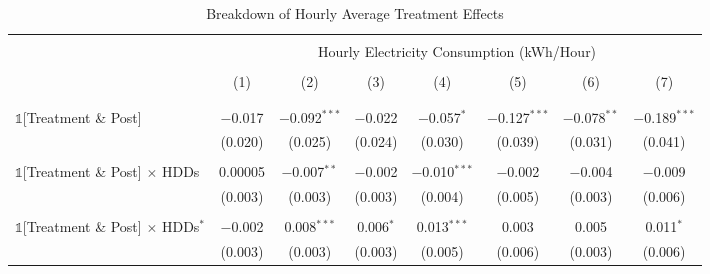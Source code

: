     \begin{table}[t!]
        \centering
        \caption{Breakdown of Hourly Average Treatment Effects}
        \label{Table:Breakdown-of-Hourly-ATEs}
        \vspace{0.3cm}
        \small
        \begin{adjustbox}{scale = 0.83}
            \begin{threeparttable}
                \begin{tabular}{@{\extracolsep{20pt}}lccccccc}
                    \\[-5.5ex]
                    \hline \hline
                    \\[-3.0ex]
                    & \multicolumn{7}{c}{Hourly Electricity Consumption  (kWh/Hour)} \\
                    \\[-3.0ex]
                    & (1) & (2) & (3) & (4) & (5) & (6) & (7) \\
                    \\[-3.0ex]
                    \hline
                    \\[-2.0ex]
                    $\mathbb{1}$[Treatment \& Post] & $-$0.017 & $-$0.092$^{***}$ & $-$0.022 & $-$0.057$^{*}$ & $-$0.127$^{***}$ & $-$0.078$^{**}$ & $-$0.189$^{***}$ \\
                    & (0.020) & (0.025) & (0.024) & (0.030) & (0.039) & (0.031) & (0.041) \\
                    & & & & & & & \\
                    $\mathbb{1}$[Treatment \& Post] $\times$ HDDs & 0.00005 & $-$0.007$^{**}$ & $-$0.002 & $-$0.010$^{***}$ & $-$0.002 & $-$0.004 & $-$0.009 \\
                    & (0.003) & (0.003) & (0.003) & (0.004) & (0.005) & (0.003) & (0.006) \\
                    & & & & & & & \\
                    $\mathbb{1}$[Treatment \& Post] $\times$ HDDs$^{*}$ & $-$0.002 & 0.008$^{***}$ & 0.006$^{*}$ & 0.013$^{***}$ & 0.003 & 0.005 & 0.011$^{*}$ \\
                    & (0.003) & (0.003) & (0.003) & (0.005) & (0.006) & (0.003) & (0.006) \\

\end{tabular}
\end{threeparttable}
\end{adjustbox}
\end{table}
